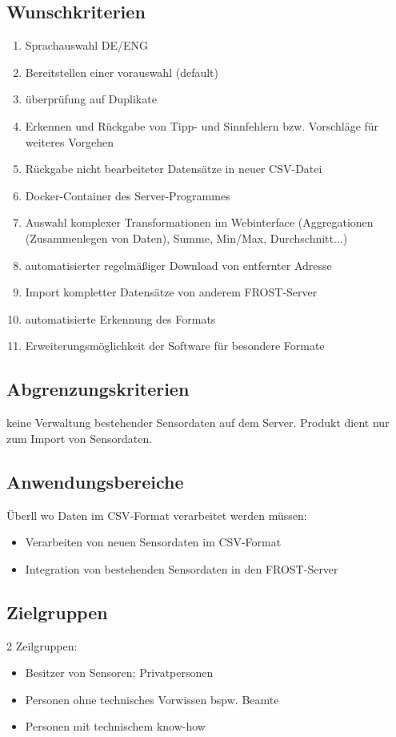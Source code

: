 \documentclass[12 pt]{article}
\begin{document}
\subsection{Wunschkriterien}
\begin{enumerate}
\item Sprachauswahl DE/ENG
\item Bereitstellen einer vorauswahl (default)
\item überprüfung auf Duplikate
\item Erkennen und Rückgabe von Tipp- und Sinnfehlern bzw. Vorschläge für weiteres Vorgehen
\item Rückgabe nicht bearbeiteter Datensätze in neuer CSV-Datei
\item Docker-Container des Server-Programmes
\item Auswahl komplexer Transformationen im Webinterface (Aggregationen (Zusammenlegen von Daten), Summe, Min/Max, Durchschnitt...)
\item automatisierter regelmäßiger Download von entfernter Adresse
\item Import kompletter Datensätze von anderem FROST-Server
\item automatisierte Erkennung des Formats
\item Erweiterungsmöglichkeit der Software für besondere Formate

\end{enumerate}

\subsection{Abgrenzungskriterien}
keine Verwaltung bestehender Sensordaten auf dem Server. Produkt dient nur zum Import von Sensordaten.

\subsection{Anwendungsbereiche}
Überll wo Daten im CSV-Format verarbeitet werden müssen: \\
\begin{itemize}
\item Verarbeiten von neuen Sensordaten im CSV-Format
\item Integration von bestehenden Sensordaten in den FROST-Server
\end{itemize}

\subsection{Zielgruppen}
2 Zeilgruppen:
\begin{itemize}
\item Besitzer von Sensoren; Privatpersonen
\item Personen ohne technisches Vorwissen bspw. Beamte
\item Personen mit technischem know-how
\end{itemize}
\end{document}
